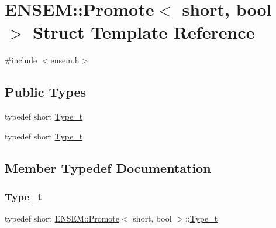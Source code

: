 \hypertarget{structENSEM_1_1Promote_3_01short_00_01bool_01_4}{}\section{E\+N\+S\+EM\+:\+:Promote$<$ short, bool $>$ Struct Template Reference}
\label{structENSEM_1_1Promote_3_01short_00_01bool_01_4}


{\ttfamily \#include $<$ensem.\+h$>$}

\subsection*{Public Types}
\begin{DoxyCompactItemize}
\item 
typedef short \mbox{\hyperlink{structENSEM_1_1Promote_3_01short_00_01bool_01_4_a4f58ddab80108afc16273b6a677fcdaf}{Type\+\_\+t}}
\item 
typedef short \mbox{\hyperlink{structENSEM_1_1Promote_3_01short_00_01bool_01_4_a4f58ddab80108afc16273b6a677fcdaf}{Type\+\_\+t}}
\end{DoxyCompactItemize}


\subsection{Member Typedef Documentation}
\mbox{\label{structENSEM_1_1Promote_3_01short_00_01bool_01_4_a4f58ddab80108afc16273b6a677fcdaf}} 
\subsubsection{\texorpdfstring{Type\_t}{Type\_t}\hspace{0.1cm}{\footnotesize\ttfamily [1/2]}}
{\footnotesize\ttfamily typedef short \mbox{\hyperlink{structENSEM_1_1Promote}{E\+N\+S\+E\+M\+::\+Promote}}$<$ short, bool $>$\+::\mbox{\hyperlink{structENSEM_1_1Promote_3_01short_00_01bool_01_4_a4f58ddab80108afc16273b6a677fcdaf}{Type\+\_\+t}}}

\mbox{\label{structENSEM_1_1Promote_3_01short_00_01bool_01_4_a4f58ddab80108afc16273b6a677fcdaf}} 
